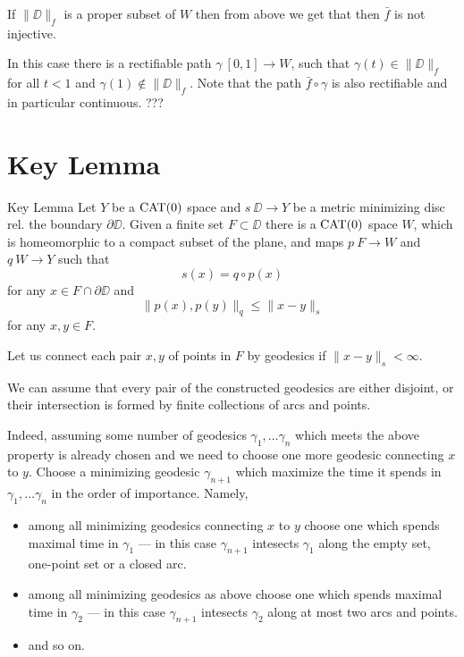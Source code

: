 \documentclass[a4paper,10pt]{amsart}
\begin{document}
If $\|\DD\|_f$ is a proper subset of $W$ 
then from above we get that
then $\bar f$ is not injective.

In this case there is a rectifiable path $\gamma\:[0,1]\to W$,
such that $\gamma(t)\in\|\DD\|_f$ for all $t<1$ and $\gamma(1)\notin \|\DD\|_f$.
Note that the path $\bar f\circ \gamma$ is also rectifiable and in particular continuous.
???
\qeds








\section{Key Lemma}


\begin{thm}{Key Lemma}\label{lem:key}
Let $Y$ be a $\mathop{\rm CAT}\nolimits(0)$ space and $s\:\DD\to Y$ 
be a metric minimizing disc rel. the boundary $\partial \DD$.
Given a finite set $F\subset \DD$
there is a $\mathop{\rm CAT}\nolimits(0)$ space $W$, which is homeomorphic to a compact subset of the plane,
and maps $p\:F\to W$ and $q\:W\to Y$ such that
\[s(x)=q\circ p(x)\] 
for any $x\in F\cap \partial \DD$
and 
\[\|p(x),p(y)\|_q\le \|x-y\|_s\] 
for any $x,y\in F$.
\end{thm}

Let us connect each pair $x,y$ of points in $F$ by geodesics
if $\|x-y\|_s<\infty$.

We can assume that 
every pair of the constructed geodesics 
are either disjoint, or their intersection is formed by finite collections of arcs and points.

Indeed, assuming some number of geodesics $\gamma_1,\dots\gamma_n$ which meets the above property is already chosen and we need to choose one more geodesic connecting $x$ to $y$.
Choose a minimizing geodesic $\gamma_{n+1}$ which maximize the time it spends in $\gamma_1,\dots\gamma_n$  in the order of importance.
Namely, 
\begin{itemize}
\item  among all minimizing geodesics connecting $x$ to $y$
choose one which spends maximal time in $\gamma_1$ --- in this case $\gamma_{n+1}$ intesects $\gamma_1$ along the empty set, one-point set or a closed arc.
\item among all minimizing geodesics as above
choose one which spends maximal time in $\gamma_2$ --- in this case $\gamma_{n+1}$ intesects $\gamma_2$ along at most two arcs and points.
\item and so on.
\end{itemize}
\end{document}
